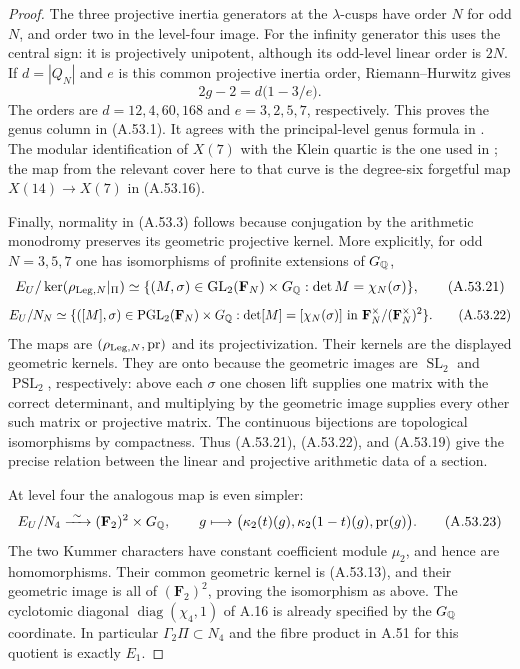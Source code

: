 \begin{proof}
The three projective inertia generators at the $\lambda$-cusps
have order $N$ for odd $N$, and order two in the level-four
image.  For the infinity generator this uses the central sign:
it is projectively unipotent, although its odd-level linear
order is $2N$.  If $d=|Q_N|$ and $e$ is this common projective
inertia order, Riemann--Hurwitz gives
\[
                    2g-2=d\bigl(1-3/e\bigr).
\tag{A.53.20}
\]
The orders are $d=12,4,60,168$ and $e=3,2,5,7$, respectively.
This proves the genus column in (A.53.1).  It agrees with the
principal-level genus formula in
\cite[Theorem 2.22 and the examples on p.~38]{LegMilneMF2017}.
The modular identification of $X(7)$ with the Klein quartic is
the one used in \cite[Sections 3--4]{LegPoonenSchaeferStoll2007};
the map from the relevant cover here to that curve is the
degree-six forgetful map $X(14)\to X(7)$ in (A.53.16).

Finally, normality in (A.53.3) follows because conjugation by
the arithmetic monodromy preserves its geometric projective
kernel.  More explicitly, for odd $N=3,5,7$ one has isomorphisms
of profinite extensions of $G_\mathbb Q$,
\[
 E_U/\ker(\rho_{{\rm Leg},N}|_\Pi)
  \simeq
 \{(M,\sigma)\in\operatorname{GL}_2(\mathbf F_N)\times G_\mathbb Q:
                         \det M=\chi_N(\sigma)\},
\tag{A.53.21}
\]
\[
 E_U/N_N\simeq
 \{([M],\sigma)\in\operatorname{PGL}_2(\mathbf F_N)\times G_\mathbb Q:
           \det[M]=[\chi_N(\sigma)]
                  \text{ in }\mathbf F_N^\times/(\mathbf F_N^\times)^2\}.
\tag{A.53.22}
\]
The maps are $(\rho_{{\rm Leg},N},\operatorname{pr})$ and its
projectivization.  Their kernels are the displayed geometric
kernels.  They are onto because the geometric images are
$\operatorname{SL}_2$ and $\operatorname{PSL}_2$, respectively:
above each $\sigma$ one chosen lift supplies one matrix with the
correct determinant, and multiplying by the geometric image
supplies every other such matrix or projective matrix.  The
continuous bijections are topological isomorphisms by compactness.
Thus (A.53.21), (A.53.22), and (A.53.19) give the precise relation
between the linear and projective arithmetic data of a section.

At level four the analogous map is even simpler:
\[
 E_U/N_4\xrightarrow{\ \sim\ }
       (\mathbf F_2)^2\times G_\mathbb Q,
 \qquad
 g\longmapsto
   \bigl(\kappa_2(t)(g),\kappa_2(1-t)(g),\operatorname{pr}(g)\bigr).
\tag{A.53.23}
\]
The two Kummer characters have constant coefficient module
$\mu_2$, and hence are homomorphisms.  Their common geometric
kernel is (A.53.13), and their geometric image is all of
$(\mathbf F_2)^2$, proving the isomorphism as above.  The
cyclotomic diagonal $\operatorname{diag}(\chi_4,1)$ of A.16 is
already specified by the $G_\mathbb Q$ coordinate.  In particular
$\Gamma_2\Pi\subset N_4$ and the fibre product in A.51 for this
quotient is exactly $E_1$.


\end{proof}
